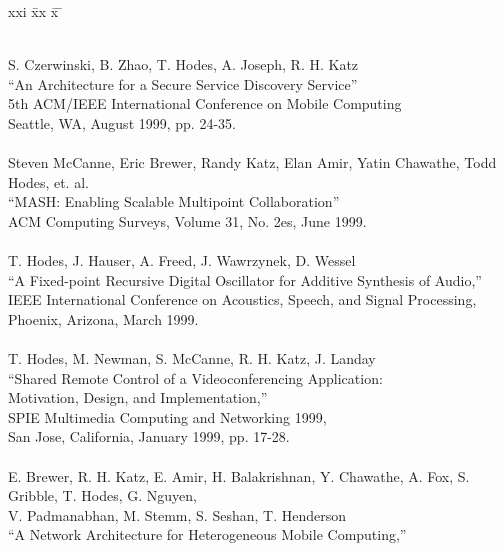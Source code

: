\begin{tabbing}
xxi \= xx \= x \= \kill





\smallskip \\[-3pt]
\>    S. Czerwinski, B. Zhao, T. Hodes, A. Joseph, R. H. Katz \\
\>\>      ``An Architecture for a Secure Service Discovery Service'' \\
\>\>       5th ACM/IEEE International Conference on Mobile Computing \\
\>\>       Seattle, WA, August 1999, pp. 24-35. \\
\smallskip \\[-3pt]
\>    Steven McCanne, Eric Brewer, Randy Katz, Elan Amir, Yatin Chawathe,
    Todd Hodes, et. al. \\
\>\>      ``MASH: Enabling Scalable Multipoint Collaboration'' \\
\>\>       ACM Computing Surveys, Volume 31, No. 2es, June 1999. \\
\smallskip \\[-3pt]
\>    T. Hodes, J. Hauser, A. Freed, J. Wawrzynek, D. Wessel \\
\>\>      ``A Fixed-point Recursive Digital Oscillator for Additive Synthesis
        of Audio,'' \\
\>\>       IEEE International Conference on Acoustics, Speech, and Signal
            Processing,  \\
\>\>        Phoenix, Arizona, March 1999. \\
\smallskip \\[-3pt]
\>    T. Hodes, M. Newman, S. McCanne, R. H. Katz, J. Landay \\
\>\>      ``Shared Remote Control of a Videoconferencing Application: \\
\>\>\>            Motivation, Design, and Implementation,'' \\
\>\>       SPIE Multimedia Computing and Networking 1999,  \\
\>\>        San Jose, California, January 1999, pp. 17-28. \\
\smallskip \\[-3pt]
\>    E. Brewer, R. H. Katz, E. Amir, H. Balakrishnan, Y. Chawathe, A. Fox,
    S. Gribble, T. Hodes, G. Nguyen, \\
\>\>\> V. Padmanabhan, M. Stemm, S. Seshan, T. Henderson \\
\>\>      ``A Network Architecture for Heterogeneous Mobile Computing,'' \\

\end{tabbing}
